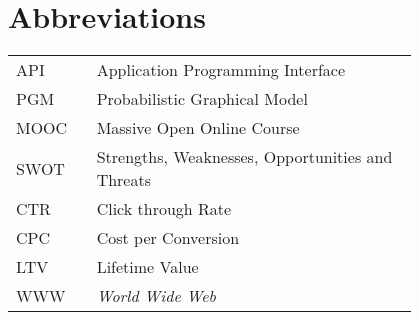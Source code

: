 \chapter*{Abbreviations}

\begin{flushleft}
\begin{tabular}{l p{0.8\linewidth}}
API      & Application Programming Interface\\
PGM      & Probabilistic Graphical Model\\
MOOC     & Massive Open Online Course\\
SWOT     & Strengths, Weaknesses, Opportunities and Threats\\
CTR 	 & Click through Rate\\
CPC 	 & Cost per Conversion\\
LTV 	 & Lifetime Value\\
WWW      & \emph{World Wide Web}
\end{tabular}
\end{flushleft}
